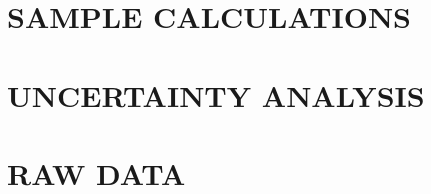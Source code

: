 \documentclass[12pt]{article}
\begin{document}
\clearpage
\begin{alphasection}
    \section{SAMPLE CALCULATIONS}\label{sec:A}
    
    \clearpage
    \section{UNCERTAINTY ANALYSIS}\label{sec:B}
    
    \clearpage
    \section{RAW DATA} \label{sec:C}
    
\end{alphasection}
\end{document}
